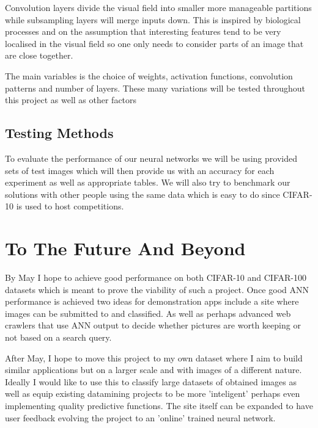 \documentclass[a0,portrait]{a0poster}
\begin{document}
\begin{multicols}{2}
Convolution layers divide the visual field into smaller more manageable partitions while subsampling layers will merge inputs down. This is inspired by biological processes and on the assumption that interesting features tend to be very localised in the visual field so one only needs to consider parts of an image that are close together.

The main variables is the choice of weights, activation functions, convolution patterns and number of layers. These many variations will be tested throughout this project as well as other factors

\subsection{Testing Methods}
To evaluate the performance of our neural networks we will be using provided sets of test images which will then provide us with an accuracy for each experiment as well as appropriate tables. We will also try to benchmark our solutions with other people using the same data which is easy to do since CIFAR-10 is used to host competitions.

\section*{To The Future And Beyond}
By May I hope to achieve good performance on both CIFAR-10 and CIFAR-100 datasets which is meant to prove the viability of such a project. Once good ANN performance is achieved two ideas for demonstration apps include a site where images can be submitted to and classified. As well as perhaps advanced web crawlers that use ANN output to decide whether pictures are worth keeping or not based on a search query.

After May, I hope to move this project to my own dataset where I aim to build similar applications but on a larger scale and with images of a different nature. Ideally I would like to use this to classify large datasets of obtained images as well as equip existing datamining projects to be more 'inteligent' perhaps even implementing quality predictive functions. The site itself can be expanded to have user feedback evolving the project to an 'online' trained neural network.


\nocite{*} %



\end{multicols}
\end{document}
